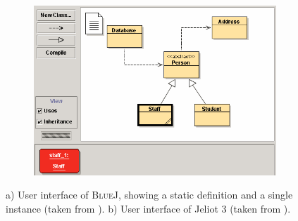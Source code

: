 \begin{figure}[tb!]
	\centering
	
	\begin{subfigure}[b]{0.45\textwidth}
		\centering
        \includegraphics[width=\textwidth]{../images/06-Koelling-BlueJ}
        \caption[User Interface of \textsc{BlueJ}]{}
		\label{fig:BlueJ}
	\end{subfigure}
	\quad
	\begin{subfigure}[b]{0.45\textwidth}
		\centering
		\caption[User Interface of \textsc{Jeliot3}]{}
		\label{fig:Jeliot3}
	\end{subfigure}
	
	\caption[Object-Oriented Teaching Environments]{
		a) User interface of \textsc{BlueJ}, showing a static definition and a single instance (taken from \cite{kolling_bluej_2003}).
		b) User interface of Jeliot 3 (taken from \cite{moreno_visualizing_2004}).
	}
\end{figure}

